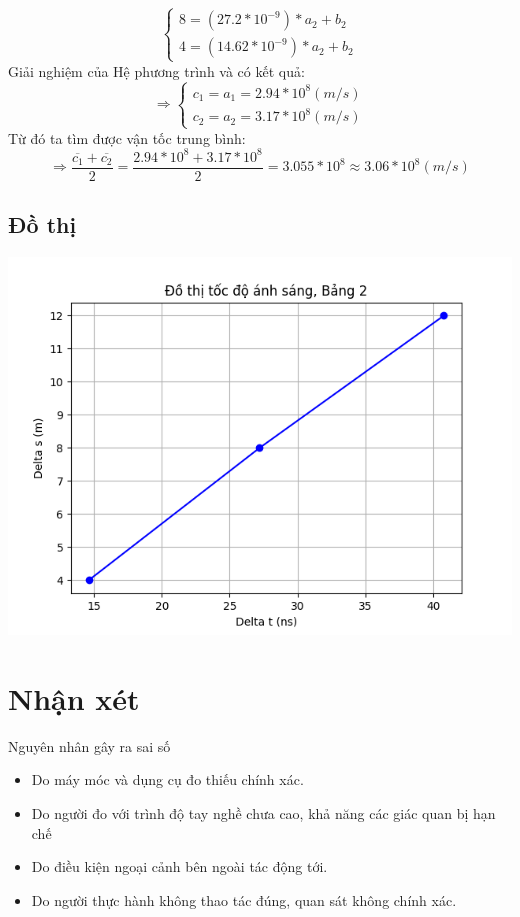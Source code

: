 \documentclass{article}[12pt]
\begin{document}
        \[\left\{ {\begin{array}{*{20}{c}}
        {8 = (27.2*{{10}^{ - 9}})*{a_2} + {b_2}}\\
        {4 = (14.62*{{10}^{ - 9}})*{a_2} + {b_2}}
        \end{array}} \right.\]
        Giải nghiệm của Hệ phương trình và có kết quả:
        \[\Rightarrow \left\{ {\begin{array}{*{20}{c}}
        {{c_1} = {a_1} = 2.94*{{10}^8}(m/s)}\\
        {{c_2} = {a_2} = 3.17*{{10}^8}(m/s)}
        \end{array}} \right.\]
	Từ đó ta tìm được vận tốc trung bình:
	\[ \Rightarrow \frac{{\overline {{c_1}}  + \overline {{c_2}} }}{2} = \frac{{2.94*{{10}^8} + 3.17*{{10}^8}}}{2} = 3.055*{10^8} \approx 3.06*{10^8} (m/s)\]
	\subsection{Đồ thị}
	\includegraphics{Figure_1.png}
	\section{Nhận xét}
	Nguyên nhân gây ra sai số
	\begin{itemize}
	    \item Do máy móc và dụng cụ đo thiếu chính xác.
	    \item Do người đo với trình độ tay nghề chưa cao, khả năng các giác quan bị hạn chế
	    \item Do điều kiện ngoại cảnh bên ngoài tác động tới.
	    \item Do người thực hành không thao tác đúng, quan sát không chính xác.
	\end{itemize}
\end{document}
